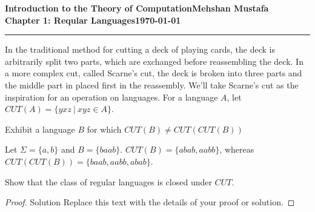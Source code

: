 \documentclass[11pt]{article}
\newcommand{\myname}{Mehshan Mustafa}
\newcommand{\dated}{\today}
\newenvironment{problem}[2][Problem]{\begin{trivlist}
\item[\hskip \labelsep {\bfseries #1}\hskip \labelsep {\bfseries #2.}]}{\end{trivlist}}
\begin{document}
\textbf{Introduction to the Theory of
Computation}\hfill\textbf{\myname}\\[0.01in]
\textbf{Chapter 1: Reqular Languages}\hfill\textbf{\dated}\\
\smallskip\hrule\bigskip

\begin{problem}{1.68}
In the traditional method for cutting a deck of playing cards, the deck is arbitrarily split two parts, which are exchanged before reassembling the deck. In a more complex cut, called Scarne’s cut, the deck is broken into three parts and the middle part in placed first in the reassembly. We’ll take Scarne’s cut as the inspiration for an operation on languages. For a language $A$, let $CUT(A) = \{yxz \ | \ xyz \in A\}$.
\end{problem}

\begin{problem}[Part]{a}
Exhibit a language $B$ for which $CUT(B) \neq CUT(CUT(B))$
\end{problem}

Let $\Sigma = \{a, b\}$ and $B = \{baab\}$. $CUT(B) = \{abab, aabb\}$, whereas $CUT(CUT(B)) = \{baab, aabb, abab\}$.

\begin{problem}[Part]{b}
Show that the class of regular languages is closed under $CUT$.
\end{problem}

\begin{proof}
Solution Replace this text with the details of your proof or solution.
\end{proof}
\end{document}
